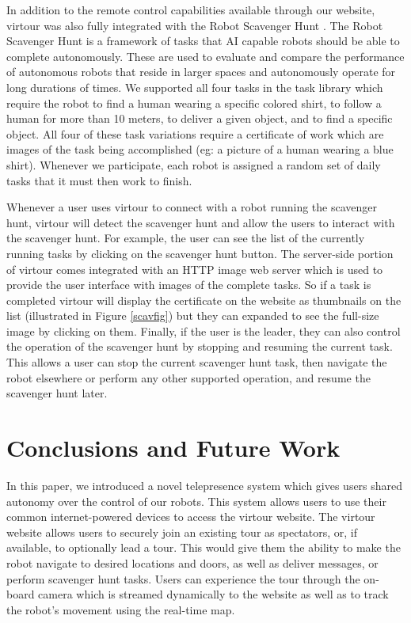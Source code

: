 \documentclass[
  oneside,
  11pt, a4paper,
  footinclude=true,
  headinclude=true,
  cleardoublepage=empty
]{article}
\begin{document}
In addition to the remote control capabilities available through our website,
virtour was also fully integrated with the Robot Scavenger Hunt
\cite{zhang2016}.  The Robot Scavenger Hunt is a framework of tasks that AI
capable robots should be able to complete autonomously. These are used to
evaluate and compare the performance of autonomous robots that reside in larger
spaces and autonomously operate for long durations of times. We supported all
four tasks in the task library which require the robot to find a human wearing
a specific colored shirt, to follow a human for more than 10 meters, to deliver
a given object, and to find a specific object. All four of these task
variations require a certificate of work which are images of the task being
accomplished (eg: a picture of a human wearing a blue shirt). Whenever we
participate, each robot is assigned a random set of daily tasks that it must
then work to finish.

Whenever a user uses virtour to connect with a robot running the scavenger
hunt, virtour will detect the scavenger hunt and allow the users to interact
with the scavenger hunt. For example, the user can see the list of the
currently running tasks by clicking on the scavenger hunt button. The
server-side portion of virtour comes integrated with an HTTP image web server
which is used to provide the user interface with images of the complete tasks.
So if a task is completed virtour will display the certificate on the website
as thumbnails on the list (illustrated in Figure \ref{scavfig}) but they can
expanded to see the full-size image by clicking on them. Finally, if the user
is the leader, they can also control the operation of the scavenger hunt by
stopping and resuming the current task. This allows a user can stop the current
scavenger hunt task, then navigate the robot elsewhere or perform any other
supported operation, and resume the scavenger hunt later.

\section{Conclusions and Future Work}

In this paper, we introduced a novel telepresence system which gives users
shared autonomy over the control of our robots. This system allows users to use
their common internet-powered devices to access the virtour website. The
virtour website allows users to securely join an existing tour as spectators,
or, if available, to optionally lead a tour. This would give them the ability
to make the robot navigate to desired locations and doors, as well as deliver
messages, or perform scavenger hunt tasks. Users can experience the tour
through the on-board camera which is streamed dynamically to the website as
well as to track the robot's movement using the real-time map.
\end{document}
